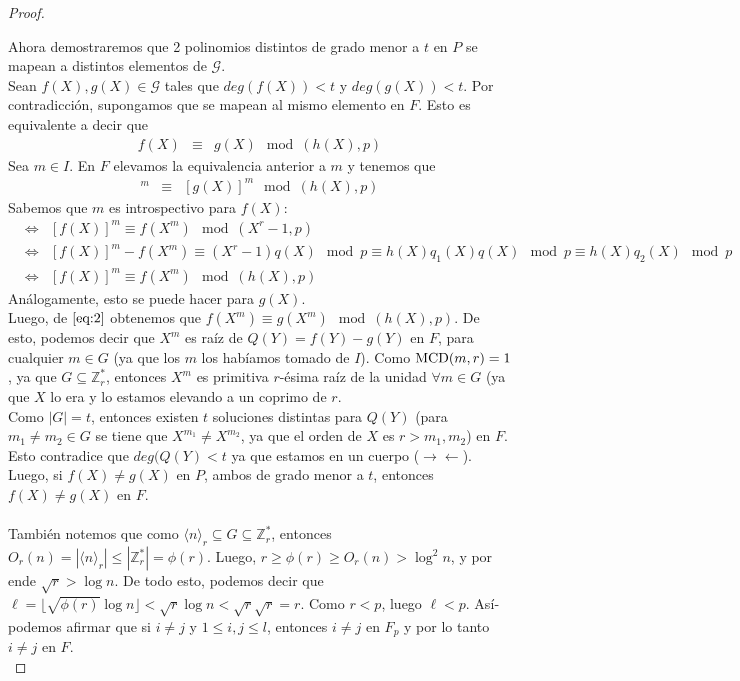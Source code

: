 \documentclass[10pt]{article}
\newcommand{\0}{\mathbf{0}}
\newcommand{\1}{\mathbf{1}}
\newcommand{\modulop}{\mod (X^r-1,p)}
\newcommand{\modulohp}{\mod (h(X),p)}
\newcommand{\modl}{\mod}
\newcommand{\MCD}{{\rm MCD}}
\newcommand{\+}{\oplus}
\newcommand{\comentario}[1]{}
\newcommand{\demostrar}[1]{}
\theoremstyle{remark}
\theoremstyle{remark}
\begin{document}
\begin{proof}
\begin{enumerate}
			\demostrar{Aca falta demostrar. Con $\eqref{eq:final4.7}$ no nos basta para demostrarlo. Ya que $\modl p$ no implica sin modulo.}	
		\end{enumerate}
		Ahora demostraremos que 2 polinomios distintos de grado menor a $t$ en $P$ se mapean a distintos elementos de $\mathcal{G}$.\\
		Sean $f(X),g(X)\in \mathcal{G}$ tales que $deg(f(X))<t$ y $deg(g(X))<t$. Por contradicción, supongamos que se mapean al mismo elemento en $F$. Esto es equivalente a decir que 
		\begin{eqnarray}
			f(X)&\equiv & g(X)\modulohp\nonumber
		\end{eqnarray} 
		Sea $m\in I$. En $F$ elevamos la equivalencia anterior a $m$ y tenemos que
		\begin{eqnarray}
			[f(X)]^m&\equiv &[g(X)]^m\modulohp\label{eq:2}
		\end{eqnarray}			    
		Sabemos que $m$ es introspectivo para $f(X)$:
		\begin{eqnarray}
			&\Leftrightarrow &[f(X)]^m \equiv f(X^m) \modulop\nonumber\\
			&\Leftrightarrow &[f(X)]^m - f(X^m) \equiv (X^r-1)q(X) \modl p \equiv h(X)q_1(X)q(X) \modl p\equiv h(X)q_2(X) \modl p \nonumber\\
			&\Leftrightarrow &[f(X)]^m \equiv f(X^m) \modulohp\nonumber
		\end{eqnarray}
		Análogamente, esto se puede hacer para $g(X)$.\\
		Luego, de $\eqref{eq:2}$ obtenemos que $f(X^m) \equiv g(X^m) \modulohp$. De esto, podemos decir que $X^m$ es raí­z de $Q(Y)=f(Y)-g(Y)$ en $F$, para cualquier $m\in G$ (ya que los $m$ los habí­amos tomado de $I$). Como $\MCD(m,r)=1$, ya que $G\subseteq \mathbb{Z}_r^*$, entonces $X^m$ es primitiva $r$-ésima raí­z de la unidad $\forall m \in G$ (ya que $X$ lo era y lo estamos elevando a un coprimo de $r$.\\
		Como $|G| = t$, entonces existen $t$ soluciones distintas para $Q(Y)$ (para $m_1\neq m_2 \in G$ se tiene que $X^{m_1}\neq X^{m_2}$, ya que el orden de $X$ es $r>m_1,m_2$) en $F$. Esto contradice que $deg(Q(Y)<t$ ya que estamos en un cuerpo \comentario{Aca usamos que sobre cuerpos "todo funciona", no se si hay que poner esto en alguna parte)}($\rightarrow\leftarrow$).\\
		Luego, si $f(X)\neq g(X)$ en $P$, ambos de grado menor a $t$, entonces $f(X)\neq g(X)$ en $F$.\\\\
		También notemos que como $\langle n\rangle _r\subseteq G\subseteq \mathbb{Z}_r^*$, entonces $O_r(n)=|\langle n\rangle _r|\leq |\mathbb{Z}_r^*|=\phi(r)$. Luego, $r\geq\phi(r)\geq O_r(n)>\log ^2 n$, y por ende $\sqrt{r}>\log  n$. De todo esto, podemos decir que $\ell =\lfloor \sqrt{\phi(r)}\log  n\rfloor < \sqrt{r}\log  n<\sqrt{r}\sqrt{r}=r$. Como $r<p$, luego $\ell <p$\comentario{Esto hay que ponerlo antes del lema A}. Así­ podemos afirmar que si $i\neq j$ y $1\leq i,j\leq l$, entonces $i\neq j$ en $F_p$ y por lo tanto $i\neq j$ en $F$.\\

\end{proof}
\end{document}
